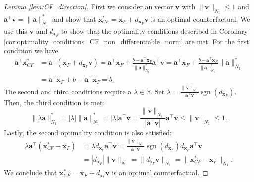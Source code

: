 \documentclass[10pt,a4paper]{amsart}
\DeclareMathOperator*{\sgn}{sgn}
\begin{document}
\begin{proof}[Lemma \ref{lem:CF_direction}]
    First we consider an vector $\bm{v}$ with $\|\bm{v}\|_{N_1}\leq 1$ and $\bm{a}^{\top}\bm{v}=\|\bm{a}\|_{N_1}^*$ and show that $\bm{x}_{CF}^*= \bm{x}_{F}+d_{\bm{x}_F}\bm{v}$ is an optimal counterfactual.
    We use this $\bm{v}$ and $d_{\bm{x}_F}$ to show that the optimality conditions described in Corollary \ref{cor:optimality_conditions_CF_non_differentiable_norm} are met. For the first condition we have
    \begin{align*}
        \bm{a}^\top \bm{x}_{CF}^* &= \bm{a}^\top (\bm{x}_F+d_{\bm{x}_F}\bm{v})= \bm{a}^\top\bm{x}_F +\frac{b-\bm{a}^{\top}\bm{x}_F}{\|\bm{a}\|_{N_1}^*}\bm{a}^\top\bm{v}
        = \bm{a}^\top\bm{x}_F +\frac{b-\bm{a}^{\top}\bm{x}_F}{\|\bm{a}\|_{N_1}^*}\|\bm{a}\|_{N_1}^*\\
        &= \bm{a}^\top\bm{x}_F +b-\bm{a}^{\top}\bm{x}_F=b.
    \end{align*}
    The second and third conditions require a $\lambda\in\mathbb{R}$. Set $\lambda=\frac{\|\bm{v}\|_{N_1}}{\bm{a}^{\top}\bm{v}} \sgn(d_{\bm{x}_F})$. Then, the third condition is met:
    \[ \|\lambda\bm{a}\|_{N_1}^* = |\lambda|   \|\bm{a}\|_{N_1}^* = |\lambda|   \bm{a}^{\top}\bm{v}
    = \frac{\|\bm{v}\|_{N_1}}{|\bm{a}^{\top}\bm{v}|} \bm{a}^{\top}\bm{v}\leq \|\bm{v}\|_{N_1}\leq 1.\]
    Lastly, the second optimality condition is also satisfied:
    \begin{align*}
    \lambda \bm{a}^\top (\bm{x}_{CF}^* - \bm{x}_F) &= \lambda  d_{\bm{x}_F}  \bm{a}^\top \bm{v}
    =\frac{\|\bm{v}\|_{N_1}}{\bm{a}^{\top}\bm{v}}   \sgn(d_{\bm{x}_F})   d_{\bm{x}_F}   \bm{a}^\top \bm{v}\\
    &= |d_{\bm{x}_F}|  \|\bm{v}\|_{N_1} =\|d_{\bm{x}_F}  \bm{v}\|_{N_1} =\|\bm{x}_{CF}^* - \bm{x}_F\|_{N_1} .
    \end{align*}
    We conclude that $\bm{x}_{CF}^*= \bm{x}_{F}+d_{\bm{x}_F}\bm{v}$ is an optimal counterfactual.


\end{proof}
\end{document}
